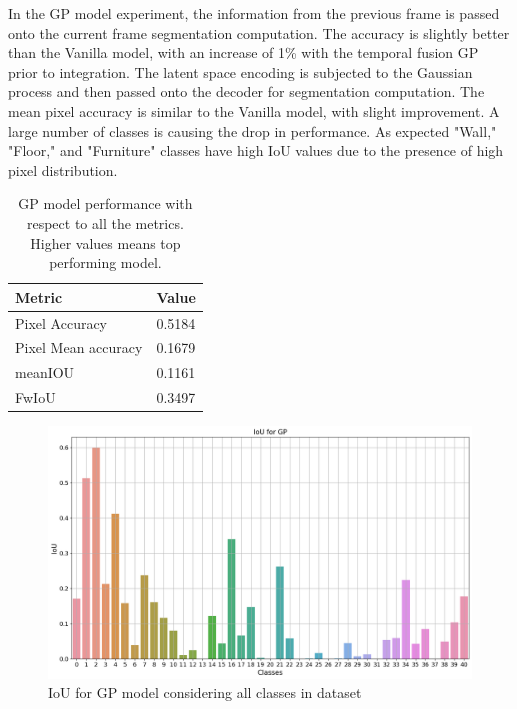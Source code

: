     In the GP model experiment, the information from the previous frame is passed onto the current frame segmentation computation. The accuracy is slightly better than the Vanilla model, with an increase of 1\% with the temporal fusion GP prior to integration. The latent space encoding is subjected to the Gaussian process and then passed onto the decoder for segmentation computation. The mean pixel accuracy is similar to the Vanilla model, with slight improvement. A large number of classes is causing the drop in performance. As expected "Wall," "Floor," and "Furniture" classes have high IoU values due to the presence of high pixel distribution. 
    
    \begin{table}
	\begin{center}
		\begin{tabular}{ | l | p{12cm} |}
			\hline
			
			\cellcolor{purple!30}Metric & \cellcolor{purple!30}Value \\ \hline
			Pixel Accuracy & 0.5184 \\ \hline
			Pixel Mean accuracy & 0.1679  \\ \hline
			meanIOU & 0.1161 \\ \hline
			FwIoU & 0.3497 \\ \hline
			\hline
		\end{tabular}
		\caption{GP model performance with respect to all the metrics. Higher values means top performing model.}
		\label{tab:caption}
	\end{center}
	\end{table}
	
	\begin{figure}
		\centering
		\includegraphics[width=13cm]{images/iou_gp_scannet_all_classes.png}
		\caption{IoU for GP model considering all classes in dataset}
		\label{fig:scannet_class}
	\end{figure} 

